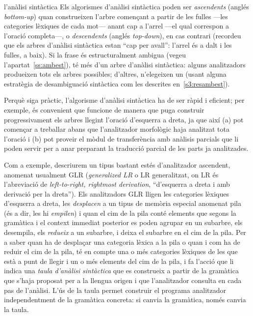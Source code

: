 \begin{persabermes}{l'anàlisi sintàctica}  
  Els algorismes d'anàlisi sintàctica poden ser {\em ascendents}
  (anglés \emph{bottom-up}) quan construeixen l'arbre començant a
  partir de les fulles ---les categories lèxiques de cada mot--- anant
  cap a l'arrel ---el qual correspon a l'oració completa---, o
  \emph{descendents} (anglés \emph{top-down}), en cas contrari
  (recordeu que els arbres d'anàlisi sintàctica estan ``cap per
  avall'': l'arrel és a dalt i les fulles, a baix). Si la frase és
  estructuralment ambigua (vegeu l'apartat~\ref{ss:ambest}), té més
  d'un arbre d'anàlisi sintàctica: alguns analitzadors produeixen tots
  els arbres possibles; d'altres, n'elegeixen un (usant alguna
  estratègia de desambiguació sintàctica com les descrites
  en~\ref{s3:resambest}).

  Perquè siga pràctic, l'algorisme d'anàlisi sintàctica ha de ser
  ràpid i eficient; per exemple, és convenient que funcione de manera
  que puga construir progressivament els arbres llegint l'oració
  d'esquerra a dreta, ja que així (a) pot començar a treballar abans
  que l'analitzador morfològic haja analitzat tota l'oració i (b) pot
  proveir el mòdul de transferència amb anàlisis parcials que li poden
  servir per a anar preparant la traducció parcial de les parts ja
  analitzades.

  Com a exemple, descriurem un tipus bastant estés d'analitzador
  ascendent, anomenat usualment GLR (\emph{generalized LR} o LR
  generalitzat, on LR és l'abreviació de \emph{left-to-right,
    rightmost derivation}, ``d'esquerra a dreta i amb derivació per la
  dreta'').  Els analitzadors GLR lligen les categories lèxiques
  d'esquerra a dreta, les \emph{desplacen} a un tipus de memòria
  especial anomenat pila (és a dir, les hi \emph{empilen}) i quan el
  cim de la pila conté elements que segons la gramàtica i el context
  immediat posterior es poden agrupar en un subarbre, els desempila,
  els \emph{redueix} a un subarbre, i deixa el subarbre en el cim de
  la pila. Per a saber quan ha de desplaçar una categoria lèxica a la
  pila o quan i com ha de reduir el cim de la pila, té en compte una o
  més categories lèxiques de les que està a punt de llegir i un o més
  elements del cim de la pila, i fa l'acció que li indica una
  \emph{taula d'anàlisi sintàctica} que es construeix a partir de la
  gramàtica que s'haja proposat per a la llengua origen i que
  l'analitzador consulta en cada pas de l'anàlisi. L'ús de la taula
  permet construir el programa analitzador independentment de la
  gramàtica concreta: si canvia la gramàtica, només canvia la taula.


\end{persabermes}
